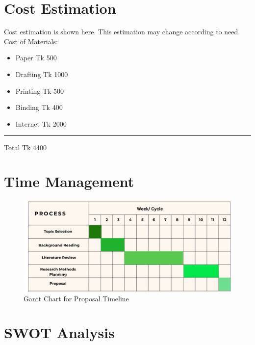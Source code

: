\section{Cost Estimation}
Cost estimation is shown here. This estimation may change according to need.\\
Cost of Materials:
\begin{itemize}[label=\textbullet]
  \item Paper \hspace{4.5cm} Tk 500
  \item Drafting \hspace{4cm} Tk 1000
  \item Printing \hspace{4cm} Tk 500
  \item Binding \hspace{4cm} Tk 400
  \item Internet \hspace{4cm} Tk 2000
\end{itemize}

\rule{\linewidth}{1pt}
Total \hspace{5.4cm} Tk 4400
\section{Time Management}
\begin{figure}[h]
    \centering
    \includegraphics[width=1\linewidth]{figures/Mon.png} 
    \caption{Gantt Chart for Proposal Timeline}
    \label{fig:myimage}
\end{figure}


\section{SWOT Analysis}
